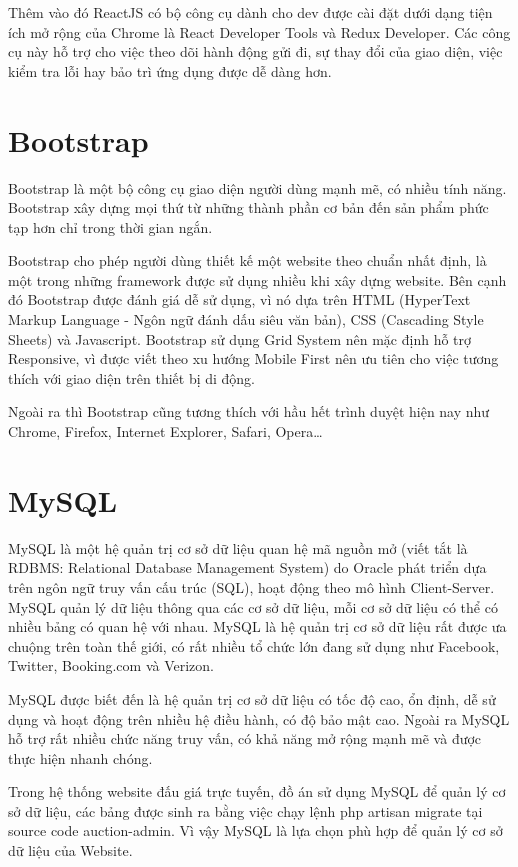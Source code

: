 \documentclass[../DoAn.tex]{subfiles}
\begin{document}
Thêm vào đó ReactJS có bộ công cụ dành cho dev được cài đặt dưới dạng tiện ích mở rộng của Chrome là React Developer Tools và Redux Developer. Các công cụ này hỗ trợ cho việc theo dõi hành động gửi đi, sự thay đổi của giao diện, việc kiểm tra lỗi hay bảo trì ứng dụng được dễ dàng hơn.
\section{Bootstrap}
\label{section:3.3}
Bootstrap là một bộ công cụ giao diện người dùng mạnh mẽ, có nhiều tính năng. Bootstrap xây dựng mọi thứ từ những thành phần cơ bản đến sản phẩm phức tạp hơn chỉ trong thời gian ngắn\cite{Bootstrap}.

Bootstrap cho phép người dùng thiết kế một website theo chuẩn nhất định, là một trong những framework được sử dụng nhiều khi xây dựng website. Bên cạnh đó Bootstrap được đánh giá dễ sử dụng, vì nó dựa trên HTML (HyperText Markup Language - Ngôn ngữ đánh dấu siêu văn bản), CSS (Cascading Style Sheets) và Javascript. Bootstrap sử dụng Grid System nên mặc định hỗ trợ Responsive, vì được viết theo xu hướng Mobile First nên ưu tiên cho việc tương thích với giao diện trên thiết bị di động.

Ngoài ra thì Bootstrap cũng tương thích với hầu hết trình duyệt hiện nay như Chrome, Firefox, Internet Explorer, Safari, Opera…
\section{MySQL}
\label{section:3.4}
MySQL là một hệ quản trị cơ sở dữ liệu quan hệ mã nguồn mở (viết tắt là RDBMS: Relational Database Management System) do Oracle phát triển dựa trên ngôn ngữ truy vấn cấu trúc (SQL), hoạt động theo mô hình Client-Server. MySQL quản lý dữ liệu thông qua các cơ sở dữ liệu, mỗi cơ sở dữ liệu có thể có nhiều bảng có quan hệ với nhau. MySQL là hệ quản trị cơ sở dữ liệu rất được ưa chuộng trên toàn thế giới, có rất nhiều tổ chức lớn đang sử dụng như Facebook, Twitter, Booking.com và Verizon\cite{MySQL}.

MySQL được biết đến là hệ quản trị cơ sở dữ liệu có tốc độ cao, ổn định, dễ sử dụng và hoạt động trên nhiều hệ điều hành, có độ bảo mật cao. Ngoài ra MySQL hỗ trợ rất nhiều chức năng truy vấn, có khả năng mở rộng mạnh mẽ và được thực hiện nhanh chóng.

Trong hệ thống website đấu giá trực tuyến, đồ án sử dụng MySQL để quản lý cơ sở dữ liệu, các bảng được sinh ra bằng việc chạy lệnh php artisan migrate tại source code auction-admin. Vì vậy MySQL là lựa chọn phù hợp để quản lý cơ sở dữ liệu của Website.
\end{document}
